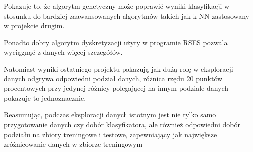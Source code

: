 \documentclass[12pt,oneside,a4paper]{book} %
\theoremstyle{break}
\begin{document}
Pokazuje to, że algorytm genetyczny może poprawić wyniki klasyfikacji w stosunku do bardziej zaawansowanych algorytmów takich jak k-NN zastosowany w projekcie drugim.

Ponadto dobry algorytm dyskretyzacji użyty w programie RSES pozwala wyciągnąć z danych więcej szczegółów.

Natomiast wyniki ostatniego projektu pokazują jak dużą rolę w eksploracji danych odgrywa odpowiedni podział danych, różnica rzędu 20 punktów procentowych przy jedynej różnicy polegającej na innym podziale danych pokazuje to jednoznacznie.

Reasumując, podczas eksploracji danych istotnym jest nie tylko samo przygotowanie danych czy dobór klasyfikatora, ale również odpowiedni dobór podziału na zbiory treningowe i testowe, zapewniający jak największe zróżnicowanie danych w zbiorze treningowym
\end{document}
